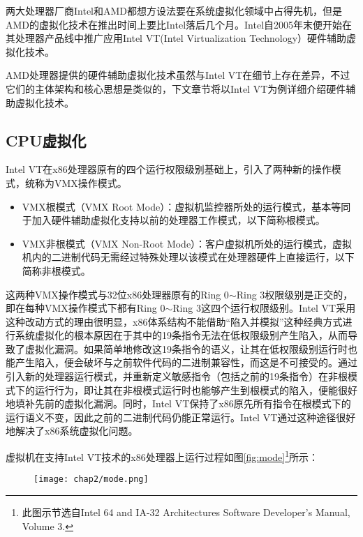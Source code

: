 两大处理器厂商Intel和AMD都想方设法要在系统虚拟化领域中占得先机，但是AMD的虚拟化技术在推出时间上要比Intel落后几个月。Intel自2005年末便开始在其处理器产品线中推广应用Intel VT(Intel Virtualization Technology）硬件辅助虚拟化技术。

AMD处理器提供的硬件辅助虚拟化技术虽然与Intel VT在细节上存在差异，不过它们的主体架构和核心思想是类似的，下文章节将以Intel VT为例详细介绍硬件辅助虚拟化技术。

\subsection{CPU虚拟化}

Intel VT在x86处理器原有的四个运行权限级别基础上，引入了两种新的操作模式，统称为VMX操作模式。

\begin{itemize}
\item VMX根模式（VMX Root Mode）：虚拟机监控器所处的运行模式，基本等同于加入硬件辅助虚拟化支持以前的处理器工作模式，以下简称根模式。
\item VMX非根模式（VMX Non-Root Mode）：客户虚拟机所处的运行模式，虚拟机内的二进制代码无需经过特殊处理以该模式在处理器硬件上直接运行，以下简称非根模式。
\end{itemize}

这两种VMX操作模式与32位x86处理器原有的Ring 0$\sim$Ring 3权限级别是正交的，即在每种VMX操作模式下都有Ring 0$\sim$Ring 3这四个运行权限级别。Intel VT采用这种改动方式的理由很明显，x86体系结构不能借助``陷入并模拟''这种经典方式进行系统虚拟化的根本原因在于其中的19条指令无法在低权限级别产生陷入，从而导致了虚拟化漏洞。如果简单地修改这19条指令的语义，让其在低权限级别运行时也能产生陷入，便会破坏与之前软件代码的二进制兼容性，而这是不可接受的。通过引入新的处理器运行模式，并重新定义敏感指令（包括之前的19条指令）在非根模式下的运行行为，即让其在非根模式运行时也能够产生到根模式的陷入，便能很好地填补先前的虚拟化漏洞。同时，Intel VT保持了x86原先所有指令在根模式下的运行语义不变，因此之前的二进制代码仍能正常运行。Intel VT通过这种途径很好地解决了x86系统虚拟化问题。

虚拟机在支持Intel VT技术的x86处理器上运行过程如图\ref{fig:mode}\footnote{此图示节选自Intel{\textregistered} 64 and IA-32 Architectures Software Developer's Manual, Volume 3.}所示：

\begin{figure}[!htbp]
  \centering
  \texttt{[image: chap2/mode.png]}
\end{figure}

